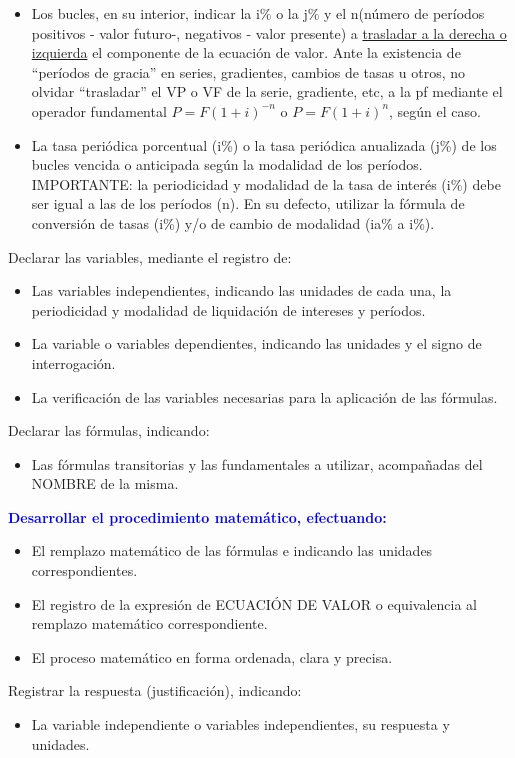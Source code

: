 \begin{enumerate}
\begin{itemize}
		      \item Los bucles, en su interior, indicar la i\% o la j\% y el n(número de períodos positivos - valor futuro-, negativos - valor presente) a \underline{trasladar a la derecha o izquierda} el componente de la ecuación de valor. Ante la existencia de ``períodos de gracia'' en series, gradientes, cambios de tasas u otros, no olvidar ``trasladar'' el VP o VF de la serie, gradiente, etc, a la pf mediante el operador fundamental $P=F(1+i)^{-n}$ o $P=F(1+i)^{n}$, según el caso.
		      \item La tasa periódica porcentual (i\%) o la tasa periódica anualizada (j\%) de los bucles vencida o anticipada según la modalidad de los períodos. IMPORTANTE: la periodicidad y modalidad de la tasa de interés (i\%) debe ser igual a las de los períodos (n). En su defecto, utilizar la fórmula de conversión de tasas (i\%) y/o de cambio de modalidad (ia\% a i\%).
	      \end{itemize}
	\item Declarar las variables, mediante el registro de:
	      \begin{itemize}
		      \item Las variables independientes, indicando las unidades de cada una, la periodicidad y modalidad de liquidación de intereses y períodos.
		      \item La variable o variables dependientes, indicando las unidades y el signo de interrogación.
		      \item La verificación de las variables necesarias para la aplicación de las fórmulas.
	      \end{itemize}
	\item Declarar las fórmulas, indicando:
	      \begin{itemize}
		      \item Las fórmulas transitorias y las fundamentales a utilizar, acompañadas del NOMBRE de la misma.
	      \end{itemize}
	      \textcolor{Blue}{\item \textbf{Desarrollar el procedimiento matemático, efectuando:}}
	      \begin{itemize}
		      \color{Blue}
		      \item El remplazo matemático de las fórmulas e indicando las unidades correspondientes.
		      \item El registro de la expresión de ECUACIÓN DE VALOR o equivalencia al remplazo matemático correspondiente.
		      \item El proceso matemático en forma ordenada, clara y precisa. \\
	      \end{itemize}
	\item Registrar la respuesta (justificación), indicando:
	      \begin{itemize}
		      \item La variable independiente o variables independientes, su respuesta y unidades. \\
	      \end{itemize}
\end{enumerate}

